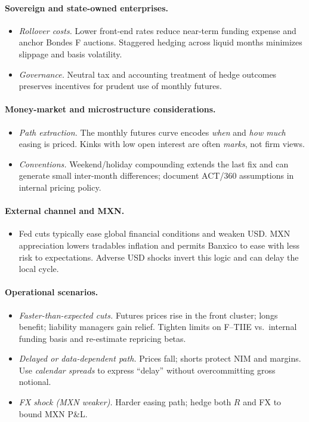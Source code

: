 \documentclass[11pt,a4paper]{article} %
\begin{document}
\paragraph{Sovereign and state-owned enterprises.}
\begin{itemize}
  \item \textit{Rollover costs.} Lower front-end rates reduce near-term funding expense and anchor Bondes F auctions. Staggered hedging across liquid months minimizes slippage and basis volatility.
  \item \textit{Governance.} Neutral tax and accounting treatment of hedge outcomes preserves incentives for prudent use of monthly futures.
\end{itemize}

\paragraph{Money-market and microstructure considerations.}
\begin{itemize}
  \item \textit{Path extraction.} The monthly futures curve encodes \emph{when} and \emph{how much} easing is priced. Kinks with low open interest are often \emph{marks}, not firm views.
  \item \textit{Conventions.} Weekend/holiday compounding extends the last fix and can generate small inter-month differences; document ACT/360 assumptions in internal pricing policy.
\end{itemize}

\paragraph{External channel and MXN.}
\begin{itemize}
  \item Fed cuts typically ease global financial conditions and weaken USD. MXN appreciation lowers tradables inflation and permits Banxico to ease with less risk to expectations. Adverse USD shocks invert this logic and can delay the local cycle.
\end{itemize}

\paragraph{Operational scenarios.}
\begin{itemize}
  \item \textit{Faster-than-expected cuts.} Futures prices rise in the front cluster; longs benefit; liability managers gain relief. Tighten limits on F--TIIE vs.\ internal funding basis and re-estimate repricing betas.
  \item \textit{Delayed or data-dependent path.} Prices fall; shorts protect NIM and margins. Use \emph{calendar spreads} to express “delay” without overcommitting gross notional.
  \item \textit{FX shock (MXN weaker).} Harder easing path; hedge both $R$ and FX to bound MXN P\&L.
\end{itemize}
\end{document}

